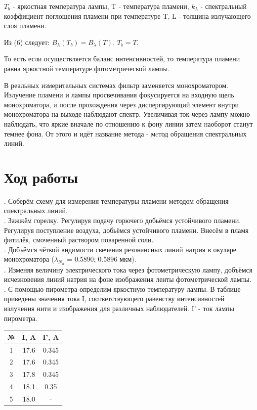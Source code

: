 \documentclass[12pt,a4paper]{article}
\begin{document}
	$T_b$ - яркостная температура лампы, T - температура пламени, $k_\lambda$ - спектральный коэффициент поглощения пламени при температуре T, L - толщина излучающего слоя пламени.
	
	Из (6) следует: $B_\lambda(T_b) = B_\lambda(T)$, $T_b = T$.
	
	То есть если осуществляется баланс интенсивностей, то температура пламени равна яркостной температуре фотометрической лампы.
	
	В реальных измерительных системах фильтр заменяется монохроматором. Излучение пламени и лампы просвечивания фокусируется на входную щель монохроматора, и после прохождения через диспергирующий элемент внутри монохроматора на выходе наблюдают спектр. Увеличивая ток через лампу можно наблюдать, что яркие вначале по отношению к фону линии затем наоборот станут темнее фона. От этого и идёт название метода - мeтод обращения спектральных линий.

	
	
	\section*{Ход работы}
	
	. Соберём схему для измерения температуры пламени методом обращения спектральных линий. \\
	
	. Зажжём горелку. Регулируя подачу горючего добьёмся устойчивого пламени. Регулируя поступление воздуха, добьёмся устойчивого пламени. Внесём в пламя фитилёк, смоченный раствором поваренной соли.\\
	
	. Добъёмся чёткой видимости свечения резонансных линий натрия в окуляре монохроматора ($\lambda_{N_a}$ = 0.5890; 0.5896 мкм).\\
	
	. Изменяя величину электрического тока через фотометрическую лампу, добъёмся исчезновения линий натрия на фоне изображения ленты фотометрической лампы.\\
	
	. С помощью пирометра определим яркостную температуру лампы. В таблице приведены значения тока I, соответствующего равенству интенсивностей излучения нити и изображения для различных наблюдателей. I' - ток лампы пирометра.
	
	\begin{table}[H]
		\centering
		\begin{tabular}{|c|c|c|}
			\hline
			№ & I, A                      & I', A \\ \hline
			1 & 17.6                      & 0.345 \\ \hline
			2 & 17.6                      & 0.345 \\ \hline
			3 & 17.8                      & 0.345 \\ \hline
			4 & 18.1					  & 0.35  \\ \hline
			5 & 18.0					  &  -	  \\ \hline
		\end{tabular}
	\end{table}
	
\end{document}
